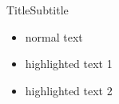 \documentclass[xcolor=dvipsnames]{beamer}
\newcommand{\ha}[1]{\textcolor{h1}{#1}}
\newcommand{\hb}[1]{\textcolor{h2}{#1}}
\begin{document}
\begin{frame}{Title}{Subtitle}

\begin{itemize}
	\item normal text
	\item \ha{highlighted text 1}
	\item \hb{highlighted text 2}
\end{itemize}

\end{frame}
\end{document}
